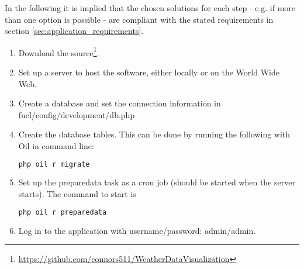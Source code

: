 In the following it is implied that the chosen solutions for each step - e.g. if more than one option is possible - are compliant with the stated requirements in section \ref{sec:application_requirements}.

\begin{enumerate}
\item Download the source\footnote{\url{https://github.com/connors511/WeatherDataVisualization}}.
\item Set up a server to host the software, either locally or on the World Wide Web.
\item Create a database and set the connection information in \textsf{fuel/config/development/db.php}
\item Create the database tables. This can be done by running the following with \textsf{Oil} in command line:
\begin{lstlisting}[language=sh]
php oil r migrate
\end{lstlisting}
\item Set up the \textsf{preparedata} task as a cron job (should be started when the server starts). The command to start is
\begin{lstlisting}[language=sh]
php oil r preparedata
\end{lstlisting}
\item Log in to the application with username/password: \textsf{admin/admin}.
\end{enumerate}
